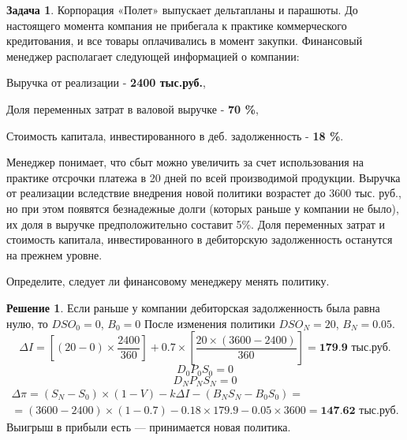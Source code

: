 \documentclass[a4paper, 14pt]{article}
\theoremstyle{plain} %
\theoremstyle{definition} %
\newtheorem*{solution}{Решение}
\newtheorem{problem}{Задача}[subsection]
\theoremstyle{remark} %
\begin{document}
\begin{problem}
	Корпорация «Полет» выпускает дельтапланы и парашюты. До настоящего  момента  компания  не  прибегала  к  практике коммерческого кредитования,  и  все  товары  оплачивались  в  момент  закупки.  Финансовый менеджер располагает следующей информацией о компании:

	Выручка от реализации - \textbf{2400 тыс.руб.},

	Доля переменных затрат в валовой выручке - \textbf{70 \%},

	Стоимость   капитала,   инвестированного   в   деб. задолженность - \textbf{18 \%}.

	Менеджер понимает, что сбыт можно увеличить за счет использования на практике отсрочки платежа в 20 дней по всей производимой продукции. Выручка от реализации вследствие внедрения новой политики возрастет до 3600 тыс. руб., но при этом появятся безнадежные долги (которых раньше у компании не было), их  доля  в  выручке  предположительно  составит  5\%.  Доля переменных затрат и стоимость капитала, инвестированного в дебиторскую задолженность останутся на прежнем уровне.

	Определите, следует ли финансовому менеджеру менять политику.
\begin{solution}
	Если раньше у компании дебиторская задолженность была равна нулю, то {$DSO_0 = 0$, $B_0 = 0$}
	После изменения политики {$DSO_N = 20$, $B_N = 0.05$}.
	\[
		\Delta I = \left[(20-0)\times \frac{2400}{360}\right]+0.7\times \left[\frac{20\times(3600-2400)}{360}\right] = \textbf{179.9 тыс.руб.}
	\]
	\[
		D_0P_0S_0 = 0
	\]
	\[
		D_NP_NS_N = 0
	\]
	\begin{multline*}
		\Delta \pi = (S_N-S_0)\times(1-V) - k\Delta I -(B_NS_N-B_0S_0) = \\ = (3600-2400)\times(1-0.7)-0.18\times 179.9 - 0.05 \times 3600 = \textbf{147.62 тыс.руб.}
	\end{multline*}
	Выигрыш в прибыли есть --- принимается новая политика.
\end{solution}
\end{problem}
\end{document}
